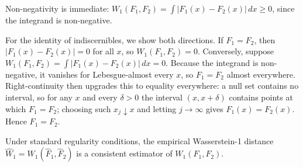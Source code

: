 \documentclass[AMA,Times1COL]{WileyNJDv5}
\begin{document}
\appendix



Non-negativity is immediate: $W_1(F_1, F_2) = \int |F_1(x) - F_2(x)| \, dx \geq 0$, since the integrand is non-negative.

For the identity of indiscernibles, we show both directions. If $F_1 = F_2$, then $|F_1(x) - F_2(x)| = 0$ for all $x$, so $W_1(F_1, F_2) = 0$. Conversely, suppose $W_1(F_1, F_2) = \int |F_1(x) - F_2(x)| \, dx = 0$. Because the integrand is non-negative, it vanishes for Lebesgue-almost every $x$, so $F_1 = F_2$ almost everywhere. Right-continuity then upgrades this to equality everywhere: a null set contains no interval, so for any $x$ and every $\delta > 0$ the interval $(x, x + \delta)$ contains points at which $F_1 = F_2$; choosing such $x_j \downarrow x$ and letting $j \to \infty$ gives $F_1(x) = F_2(x)$. Hence $F_1 = F_2$.


Under standard regularity conditions, the empirical Wasserstein-1 distance $\widehat{W}_1 = W_1(\hat{F}_1, \hat{F}_2)$ is a consistent estimator of $W_1(F_1, F_2)$.\cite{delbarrio1999}
\end{document}
